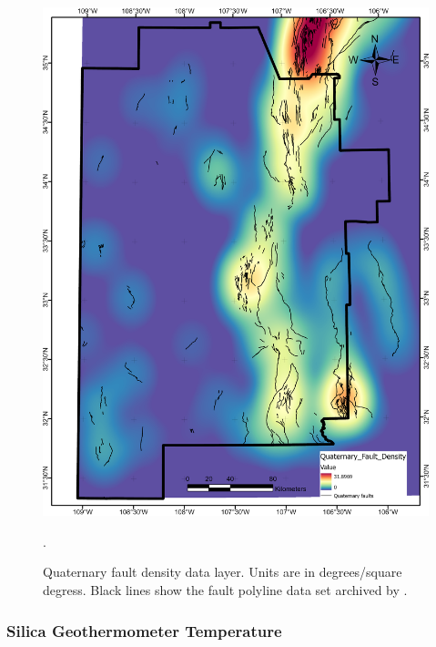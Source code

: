 \begin{figure}[!htp]
\centering
\includegraphics[scale=.50]{templates/images/Figure-QFaultDensity.png}
\caption[Quaternary fault density data layer]{Quaternary fault density data layer. Units are in degrees/square degress. Black lines show the fault polyline data set archived by \protect\citet{bielicki_hydrogeolgic_2015}.}.
\label{fig:feat_qfaults}
\end{figure}

\subsubsection{Silica Geothermometer Temperature}

